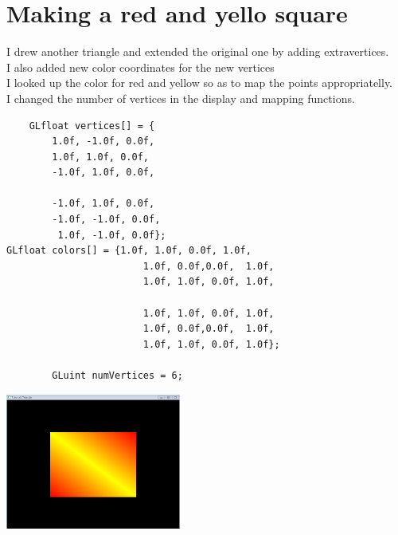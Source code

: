 \documentclass{article}
\begin{document}
\section{Making a red and yello square}
I drew another triangle and extended the original one by adding extravertices.\\
I also added new color coordinates for the new vertices\\
I looked up the color for red and yellow so as to map the points appropriatelly.\\
I changed the number of vertices in the display and mapping functions.\\

\begin{lstlisting}
	GLfloat vertices[] = { 
		1.0f, -1.0f, 0.0f,
		1.0f, 1.0f, 0.0f,
		-1.0f, 1.0f, 0.0f,

		-1.0f, 1.0f, 0.0f,
		-1.0f, -1.0f, 0.0f,
		 1.0f, -1.0f, 0.0f};
GLfloat colors[] = {1.0f, 1.0f, 0.0f, 1.0f,   
						1.0f, 0.0f,0.0f,  1.0f,   
						1.0f, 1.0f, 0.0f, 1.0f, 

						1.0f, 1.0f, 0.0f, 1.0f,
						1.0f, 0.0f,0.0f,  1.0f,    
						1.0f, 1.0f, 0.0f, 1.0f};
					
		GLuint numVertices = 6;
\end{lstlisting}


\includegraphics[height=1.75in]{square.PNG}


\pagebreak

	
\end{document}
